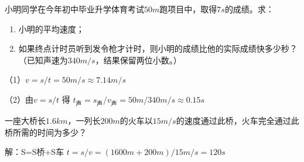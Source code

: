 \documentclass[12pt]{exam}%
\begin{document}
\begin{Aquestions}
\begin{questions}
\question
小明同学在今年初中毕业升学体育考试$50m$跑项目中，取得$7s$的成绩。求：
\begin{enumerate}
\item 小明的平均速度；
\item 如果终点计时员听到发令枪才计时，则小明的成绩比他的实际成绩快多少秒？（已知声速为$340m/s$，结果保留两位小数。）
\end{enumerate}

\begin{solution}[10ex]
（1）$v=s/t=50m/s \approx 7.14m/s $

（2）由$v=s/t$ 得 $t_ \textrm{声}=s_\textrm{声}/v_\textrm{声}=50m/340m/s \approx 0.15s$
\end{solution}


\question
一座大桥长$1.6km$，一列长$200m$的火车以$15m/s$的速度通过此桥，火车完全通过此桥所需的时间为多少？

\begin{solution}[8ex]
解：S=S桥+S车      $t=s/v=(1600m+200m)/15m/s=120s$
\end{solution}

\end{questions}
\end{Aquestions}
\end{document}
